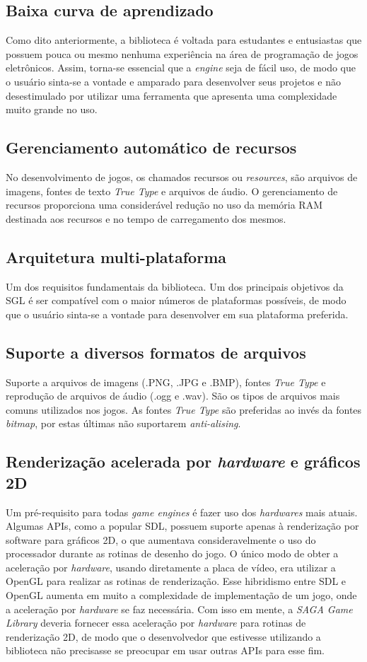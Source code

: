\subsection{Baixa curva de aprendizado}
%
Como dito anteriormente, a biblioteca é voltada para estudantes e entusiastas que possuem pouca ou mesmo nenhuma experiência na área de programação de jogos eletrônicos. Assim, torna-se essencial que a \textit{engine} seja de fácil uso, de modo que o usuário sinta-se a vontade e amparado para desenvolver seus projetos e não desestimulado por utilizar uma ferramenta que apresenta uma complexidade muito grande no uso.
%
\subsection{Gerenciamento automático de recursos}
%
No desenvolvimento de jogos, os chamados recursos ou \textit{resources}, são arquivos de imagens, fontes de texto \textit{True Type} e arquivos de áudio. O gerenciamento de recursos proporciona uma considerável redução no uso da memória RAM destinada aos recursos e no tempo de carregamento dos mesmos.
%
\subsection{Arquitetura multi-plataforma}
%
Um dos requisitos fundamentais da biblioteca. Um dos principais objetivos da SGL é ser compatível com o maior números de plataformas possíveis, de modo que o usuário sinta-se a vontade para desenvolver em sua plataforma preferida.
%
\subsection{Suporte a diversos formatos de arquivos}
%
Suporte a arquivos de imagens (.PNG, .JPG e .BMP), fontes \textit{True Type} e reprodução de arquivos de áudio (.ogg e .wav). São os tipos de arquivos mais comuns utilizados nos jogos. As fontes \textit{True Type} são preferidas ao invés da fontes \textit{bitmap}, por estas últimas não suportarem \textit{anti-alising}. 
%
\subsection{Renderização acelerada por \textit{hardware} e gráficos 2D}
%
Um pré-requisito para todas \textit{game engines} é fazer uso dos \textit{hardwares} mais atuais. Algumas APIs, como a popular SDL, possuem suporte apenas à renderização por software para gráficos 2D, o que aumentava consideravelmente o uso do processador durante as rotinas de desenho do jogo. O único modo de obter a aceleração por \textit{hardware}, usando diretamente a placa de vídeo, era utilizar a OpenGL para realizar as rotinas de renderização. Esse hibridismo entre SDL e OpenGL aumenta em muito a complexidade de implementação de um jogo, onde a aceleração por \textit{hardware} se faz necessária. Com isso em mente, a \textit{SAGA Game Library} deveria fornecer essa aceleração por \textit{hardware} para rotinas de renderização 2D, de modo que o desenvolvedor que estivesse utilizando a biblioteca não precisasse se preocupar em usar outras APIs para esse fim.
%
